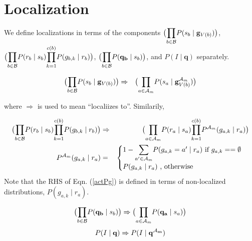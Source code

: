 \documentclass[11pt]{article}
\newcommand{\A}{{\cal A}}
\newcommand{\B}{\cal B}
\newcommand{\Am}{\A_{m}}
\begin{document}
\section*{Localization}


We define localizations in terms of the components $\big({\displaystyle \prod_{b \in {\B}}} P(s_b \mid \mathbf{g}_{V(b)}) \big )$, $\big( {\displaystyle \prod_{b \in {\B}}} P(r_b \mid s_b) {\displaystyle \prod_{k=1}^{c(b)}} P(g_{b,k} \mid r_b) \big)$, $\big( {\displaystyle \prod_{b \in {\B}}} P(\mathbf{q_b} \mid s_b)\big)$, and $P(I \mid \mathbf{q})$ separately.

\begin{eqnarray}
\big({\displaystyle \prod_{b \in {\B}}} P(s_b \mid \mathbf{g}_{V(b)}) \big ) &\Rightarrow& \big({\displaystyle \prod_{a \in {\Am}}} P(s_a \mid \mathbf{g}^{\Am}_{V({b})}) \big )
\end{eqnarray}

where $\Rightarrow$ is used to mean ``localiizes to''. Similarily, 

\begin{eqnarray}
\big( {\displaystyle \prod_{b \in {\B}}} P(r_b \mid s_b) {\displaystyle \prod_{k=1}^{c(b)}} P(g_{b,k} \mid r_b) \big) &\Rightarrow& \big( {\displaystyle \prod_{a \in \Am}} P(r_a \mid s_a) {\displaystyle \prod_{k=1}^{c(b)}} P^{\Am}(g_{a,k} \mid r_a) \big) \\
%
P^{\Am}(g_{a,k} \mid r_a) &=& \begin{cases} \label{actPg} 1-{\displaystyle \sum_{a' \in {\Am}}} P(g_{a,k} = a' \mid r_a) \mbox{ if } g_{a,k} == \emptyset \\
 P(g_{a,k} \mid r_a) \mbox{ , otherwise } \end{cases}
\end{eqnarray}
Note that the RHS of Eqn. (\ref{actPg}) is defined in terms of non-localized distributions, $P(g_{a,k} \mid r_a)$.

\begin{eqnarray}
\big( {\displaystyle \prod_{b \in {\B}}} P(\mathbf{q_b} \mid s_b)\big) \Rightarrow \big( {\displaystyle \prod_{a \in {\Am}}} P(\mathbf{q_a} \mid s_a)\big)
\end{eqnarray}
\begin{eqnarray}
P(I \mid \mathbf{q}) \Rightarrow P(I \mid \mathbf{q^{\Am}})
\end{eqnarray}
\end{document}
